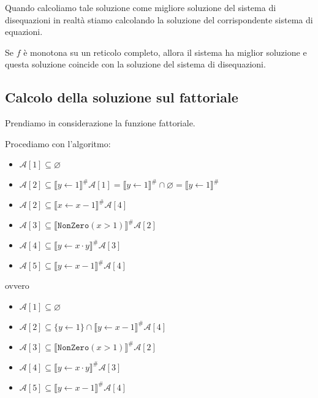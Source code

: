 Quando calcoliamo tale soluzione come migliore soluzione del sistema di disequazioni in realtà stiamo
calcolando la soluzione del corrispondente sistema di equazioni.
\begin{tcolorbox}
    Se $f$ è monotona su un reticolo completo, allora il sistema ha miglior soluzione e questa soluzione 
    coincide con la soluzione del sistema di disequazioni.
\end{tcolorbox}
\subsection{Calcolo della soluzione sul fattoriale}
Prendiamo in considerazione la funzione fattoriale.
\begin{figure}[H]
    \centering
\end{figure}
Procediamo con l'algoritmo:
\begin{itemize}
    \item $\mathcal{A}[1] \subseteq \varnothing$
    \item $\mathcal{A}[2] \subseteq \llbracket y \gets 1\rrbracket^\#\mathcal{A}[1] = \llbracket y \gets 1\rrbracket^\# \cap 
    \varnothing = \llbracket y \gets 1\rrbracket^\#$
    \item $\mathcal{A}[2] \subseteq \llbracket x \gets x - 1\rrbracket^\#\mathcal{A}[4]$
    \item $\mathcal{A}[3] \subseteq \llbracket \texttt{NonZero}(x > 1)\rrbracket^\#\mathcal{A}[2]$
    \item $\mathcal{A}[4] \subseteq \llbracket y \gets x \cdot y\rrbracket^\#\mathcal{A}[3]$
    \item $\mathcal{A}[5] \subseteq \llbracket y \gets x - 1\rrbracket^\#\mathcal{A}[4]$
\end{itemize}
ovvero
\begin{itemize}
    \item $\mathcal{A}[1] \subseteq \varnothing$
    \item $\mathcal{A}[2] \subseteq \{y \gets 1\} \cap \llbracket y \gets x - 1\rrbracket^\#\mathcal{A}[4]$
    \item $\mathcal{A}[3] \subseteq \llbracket \texttt{NonZero}(x > 1)\rrbracket^\#\mathcal{A}[2]$
    \item $\mathcal{A}[4] \subseteq \llbracket y \gets x \cdot y\rrbracket^\#\mathcal{A}[3]$
    \item $\mathcal{A}[5] \subseteq \llbracket y \gets x - 1\rrbracket^\#\mathcal{A}[4]$
\end{itemize}

